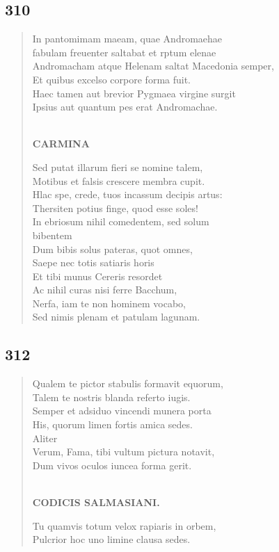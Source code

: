 \documentclass[11pt, a4paper]{report}
\begin{document}
            \subsection*{310}
      \begin{verse}
      In pantomimam maeam, quae Andromaehae \\ fabulam freuenter saltabat et rptum elenae \\ Andromacham atque Helenam saltat Macedonia semper, \\ Et quibus excelso corpore forma fuit. \\ Haec tamen aut brevior Pygmaea virgine surgit \\ Ipsius aut quantum pes erat Andromachae. \\ 
        ﻿\pagebreak 
    \begin{center} \textbf{CARMINA} \end{center} \marginpar{[260]} Sed putat illarum fieri se nomine talem, \\ Motibus et falsis crescere membra cupit. \\ Hlac spe, crede, tuos incassum decipis artus: \\ Thersiten potius finge, quod esse soles! \\ In ebriosum nihil comedentem, sed solum \\ bibentem \\ Dum bibis solus pateras, quot omnes, \\ Saepe nec totis satiaris horis \\ Et tibi munus Cereris resordet \\ Ac nihil curas nisi ferre Bacchum, \\ Nerfa, iam te non hominem vocabo, \\ Sed nimis plenam et patulam lagunam. \\ 
      \end{verse}
  
            \subsection*{312}
      \begin{verse}
      Qualem te pictor stabulis formavit equorum, \\ Talem te nostris blanda referto iugis. \\ Semper et adsiduo vincendi munera porta \\ His, quorum limen fortis amica sedes. \\ Aliter \\ Verum, Fama, tibi vultum pictura notavit, \\ Dum vivos oculos iuncea forma gerit. \\ 
        ﻿\pagebreak 
    \begin{center} \textbf{CODICIS SALMASIANI.} \end{center} \marginpar{[261]}  \marginpar{[0]} Tu quamvis totum velox rapiaris in orbem, \\ Pulcrior hoc uno limine clausa sedes. \\ 
      \end{verse}
  
\end{document}

